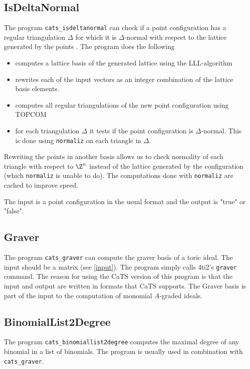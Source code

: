 \subsection{IsDeltaNormal}
\label{cats_isdeltanormal}
The program {\tt cats\_isdeltanormal} can check if a point
configuration has a regular triangulation $\Delta$ for which it is
$\Delta$-normal with respect to the lattice generated by the points
\cite{gomoryips}. The program does the following
\begin{itemize}
\item computes a lattice basis of the generated lattice using the
  LLL-algorithm \cite{lenstra}
\item rewrites each of the input vectors as an integer combination of
  the lattice basis elements.
\item computes all regular triangulations of the new point
  configuration using TOPCOM \cite{topcom}
\item for each triangulation $\Delta$ it tests if the point
  configuration is $\Delta$-normal. This is done using {\tt normaliz}
  \cite{normaliz} on each triangle in $\Delta$.
\end{itemize}
Rewriting the points in another basis allows us to check normality of
each triangle with respect to $\Z^n$ instead of the lattice generated
by the configuration (which {\tt normaliz} is unable to do).  The
computations done with {\tt normaliz} are cached to improve speed.

The input is a point configuration in the usual format and the output is "true" or "false".

\subsection{Graver}
\label{cats_graver}
The program {\tt cats\_graver} can compute the graver basis of a toric
ideal. The input should be a matrix (see \ref{input}).  The program
simply calls 4ti2's {\tt graver} command. The reason for using the
CaTS version of this program is that the input and output are written
in formats that CaTS supports. The Graver basis is part of the input 
to the computation of monomial $A$-graded ideals.

\subsection{BinomialList2Degree}
\label{cats_binomiallist2degree}
The program {\tt cats\_binomiallist2degree} computes the maximal
degree of any binomial in a list of binomials. The program is usually
used in combination with {\tt cats\_graver}.

